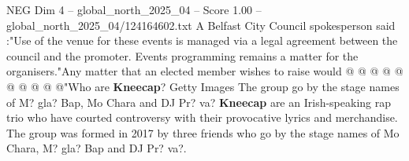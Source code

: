 \begin{textsample}{NEG Dim 4 – global\_north\_2025\_04 – Score 1.00 – global\_north\_2025\_04/124164602.txt}
A Belfast City Council spokesperson said :"Use of the venue for these events is managed via a legal agreement between the council and the promoter.
Events programming remains a matter for the organisers."Any matter that an elected member wishes to raise would @ @ @ @ @ @ @ @ @ @"Who are \textbf{Kneecap}?
Getty Images The group go by the stage names of M? gla?
Bap, Mo Chara and DJ Pr? va? \textbf{Kneecap} are an Irish-speaking rap trio who have courted controversy with their provocative lyrics and merchandise.
The group was formed in 2017 by three friends who go by the stage names of Mo Chara, M? gla?
Bap and DJ Pr? va?.

\end{textsample}
